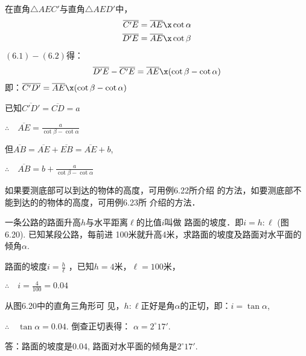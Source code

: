 \begin{figure}[htp]
\begin{minipage}[t]{0.48\textwidth}
    \caption{}
    \end{minipage}
    \begin{minipage}[t]{0.48\textwidth}
    \centering
    \caption{}
    \end{minipage}
    \end{figure}


\begin{solution}
    在直角$\triangle AEC'$与直角$\triangle AED'$中，
\begin{align}
    \overline{C'E}&=\overline{AE}\x \cot\alpha\\
    \overline{D'E}&=\overline{AE}\x \cot\beta
\end{align}
$(6.1)-(6.2)$得：
\[\overline{D'E}-\overline{C'E}=\overline{AE} \x(\cot\beta-\cot\alpha)\]
即：$\overline{C'D'}=\overline{AE} \x(\cot\beta-\cot\alpha)$

已知$\overline{C'D'}=\overline{CD}=a$

$\therefore\quad \overline{AE}=\frac{a}{\cot\beta-\cot\alpha}$

但$\overline{AB}=\overline{AE}+\overline{EB}=\overline{AE} +b$, 

$\therefore\quad \overline{AB}=b+\frac{a}{\cot\beta-\cot\alpha}$

\end{solution}

如果要测底部可以到达的物体的高度，可用例6.22所介绍
的方法，如要测底部不能到达的的物体的高度，可用例6.23所
介绍的方法．

\begin{example}
    一条公路的路面升高$h$与水平距离$\ell$的比值$i$叫做
    路面的坡度．即$i=h:\ell$ (图6.20). 已知某段公路，每前进
    100米就升高4米，求路面的坡度及路面对水平面的倾角$\alpha$.
\end{example}

\begin{solution}
    路面的坡度$i=\frac{h}{\ell}$
    ，已知$h=4$米，$\ell=100$米，

$\therefore\quad  i=\frac{4}{100}=0.04$

    从图6.20中的直角三角形可
    见，$h:\ell$正好是角$\alpha$的正切，即：$i=\tan\alpha$,
    
    $\therefore\quad \tan\alpha=0.04$. 倒查正切表得：
    $\alpha=2^{\circ}17'$.

    答：路面的坡度是0.04, 路面对水平面的倾角是$2^{\circ}17'$.
\end{solution}


